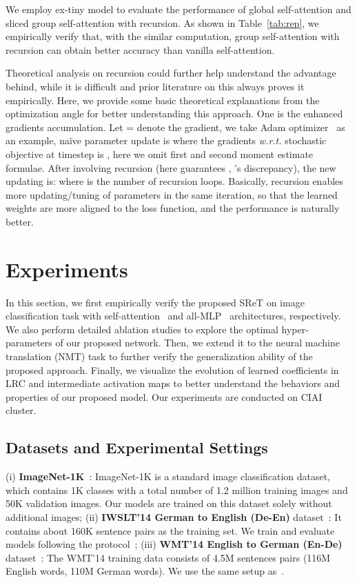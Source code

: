 \documentclass[runningheads]{llncs}
\begin{document}
	We employ ex-tiny model to evaluate the performance of global self-attention and sliced group self-attention with recursion. As shown in Table~\ref{tab:rep}, we empirically verify that, with the similar computation, group self-attention with recursion can obtain better accuracy than vanilla self-attention. 
	

	 Theoretical analysis on recursion could further help understand the advantage behind, while it is difficult and prior literature on this always proves it empirically. Here, we provide some basic theoretical explanations from the optimization angle for better understanding this approach. One is the enhanced gradients accumulation. Let = denote the gradient, we take Adam optimizer~\cite{kingma2014adam} as an example, na\"{i}ve parameter update is  where the gradients {\em w.r.t.} stochastic objective at timestep  is , here we omit first and second moment estimate formulae. After involving recursion (here  guarantees , 's discrepancy), the new updating is:  where  is the number of recursion loops. Basically, recursion enables more updating/tuning of parameters in the same iteration, so that the learned weights are more aligned to the loss function, and the performance is naturally better.
	
	\section{Experiments}
	
	In this section, we first empirically verify the proposed SReT on image classification task with self-attention~\cite{vaswani2017attention} and all-MLP~\cite{tolstikhin2021mlpmixer} architectures, respectively. We also perform detailed ablation studies to explore the optimal hyper-parameters of our proposed network. Then, we extend it to the neural machine translation (NMT) task to further verify the generalization ability of the proposed approach. Finally, we visualize the evolution of learned coefficients in LRC and intermediate activation maps to better understand the behaviors and properties of our proposed model. Our experiments are conducted on CIAI cluster.
	
	\subsection{Datasets and Experimental Settings} \label{dataset_setting}
	(i) {\bf ImageNet-1K}~\cite{deng2009imagenet}: ImageNet-1K is a standard image classification dataset, which contains 1K classes with a total number of 1.2 million training images and 50K validation images. Our models are trained on this dataset solely without additional images; (ii) {\bf IWSLT'14 German to English (De-En)} dataset~\cite{IWSLT14}: It contains about 160K sentence pairs as the training set. We train and evaluate models following the protocol~\cite{IWSLT14_fair}; (iii) {\bf WMT'14 English to German (En-De)} dataset~\cite{WMT14}: The WMT’14 training data consists of 4.5M sentences pairs (116M English words, 110M German words). We use the same setup as~\cite{luong2015effective}.
	
\end{document}
